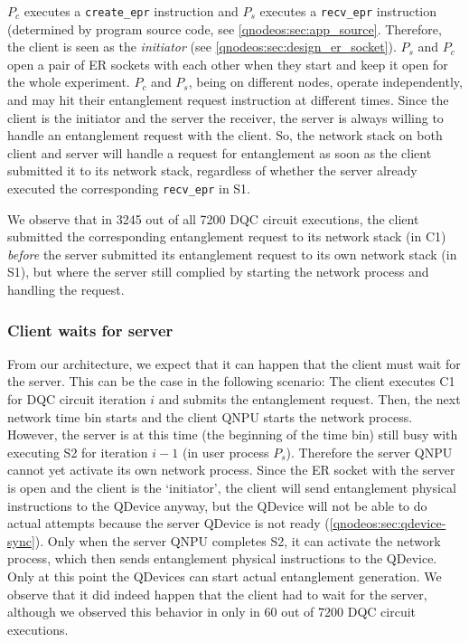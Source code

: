 $P_c$ executes a \texttt{create\_epr} instruction and $P_s$ executes a \texttt{recv\_epr} instruction (determined by program source code, see \cref{qnodeos:sec:app_source}. Therefore, the client is seen as the \emph{initiator} (see \cref{qnodeos:sec:design_er_socket}). $P_s$ and $P_c$ open a pair of \ac{ER} sockets with each other when they start and keep it open for the whole experiment. $P_c$ and $P_s$, being on different nodes, operate independently, and may hit their entanglement request instruction at different times. Since the client is the initiator and the server the receiver, the server is always willing to handle an entanglement request with the client. So, the network stack on both client and server will handle a request for entanglement as soon as the client submitted it to its network stack, regardless of whether the server already executed the corresponding \texttt{recv\_epr} in S1.

We observe that in 3245 out of all 7200 \ac{DQC} circuit executions, the client submitted the corresponding entanglement request to its network stack (in C1) \textit{before} the server submitted its entanglement request to its own network stack (in S1), but where the server still complied by starting the network process and handling the request.

\subsubsection{Client waits for server}

From our architecture, we expect that it can happen that the client must wait for the server. This can be the case in the following scenario: The client executes C1 for \ac{DQC} circuit iteration $i$ and submits the entanglement request. Then, the next network time bin starts and the client \ac{QNPU} starts the network process. However, the server is at this time (the beginning of the time bin) still busy with executing S2 for iteration $i-1$ (in user process $P_s$). Therefore the server \ac{QNPU} cannot yet activate its own network process. Since the \ac{ER} socket with the server is open and the client is the `initiator', the client will send entanglement physical instructions to the \ac{QDevice} anyway, but the \ac{QDevice} will not be able to do actual attempts because the server \ac{QDevice} is not ready (\cref{qnodeos:sec:qdevice-sync}). Only when the server \ac{QNPU} completes S2, it can activate the network process, which then sends entanglement physical instructions to the \ac{QDevice}. Only at this point the \acp{QDevice} can start actual entanglement generation. We observe that it did indeed happen that the client had to wait for the server, although we observed this behavior in only in 60 out of 7200 \ac{DQC} circuit executions.


